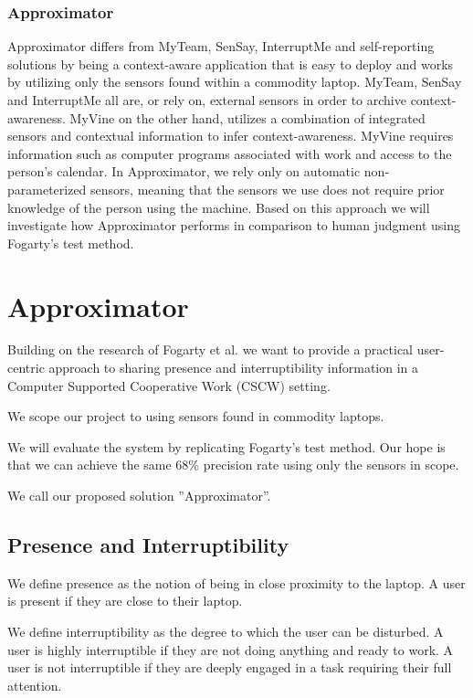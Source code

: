 \documentclass{sigchi}
\begin{document}
\subsubsection{Approximator}
Approximator differs from MyTeam, SenSay, InterruptMe and self-reporting solutions by being a context-aware application that is easy to deploy and works by utilizing only the sensors found within a commodity laptop.
MyTeam, SenSay and InterruptMe all are, or rely on, external sensors in order to archive context-awareness.
MyVine on the other hand, utilizes a combination of integrated sensors and contextual information to infer context-awareness.
MyVine requires information such as computer programs associated with work and access to the person's calendar.
In Approximator, we rely only on automatic non-parameterized sensors, meaning that the sensors we use does not require prior knowledge of the person using the machine.
Based on this approach we will investigate how Approximator performs in comparison to human judgment using Fogarty's test method.

\section{Approximator}
Building on the research of Fogarty et al. \cite{fogarty2005predicting} we want to provide a practical user-centric approach to sharing presence and interruptibility information in a Computer Supported Cooperative Work (CSCW) setting.

We scope our project to using sensors found in commodity laptops.

We will evaluate the system by replicating Fogarty's test method.
Our hope is that we can achieve the same 68\% precision rate using only the sensors in scope.

We call our proposed solution ''Approximator''.

\subsection{Presence and Interruptibility}
We define presence as the notion of being in close proximity to the laptop. A user is present if they are close to their laptop.

We define interruptibility as the degree to which the user can be disturbed. A user is highly interruptible if they are not doing anything and ready to work. A user is not interruptible if they are deeply engaged in a task requiring their full attention.
\end{document}
